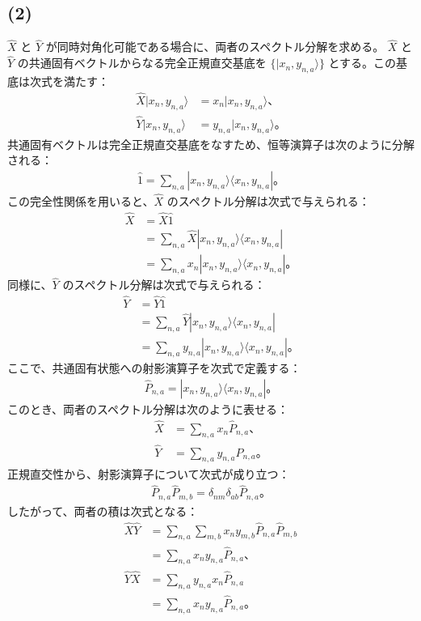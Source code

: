 \documentclass[platex,dvipdfmx,a4paper]{jsarticle}
\begin{document}
\subsection*{(2)}
$\hat{X}$ と $\hat{Y}$ が同時対角化可能である場合に、両者のスペクトル分解を求める。
$\hat{X}$ と $\hat{Y}$ の共通固有ベクトルからなる完全正規直交基底を $\{|x_n,y_{n,a}\rangle\}$ とする。この基底は次式を満たす：
\begin{align*}
  \hat{X}|x_n,y_{n,a}\rangle &= x_n|x_n,y_{n,a}\rangle、\\
  \hat{Y}|x_n,y_{n,a}\rangle &= y_{n,a}|x_n,y_{n,a}\rangle。
\end{align*}
共通固有ベクトルは完全正規直交基底をなすため、恒等演算子は次のように分解される：
\begin{align*}
  \hat{1}=\sum_{n,a}|x_n,y_{n,a}\rangle\langle x_n,y_{n,a}|。
\end{align*}
この完全性関係を用いると、$\hat{X}$ のスペクトル分解は次式で与えられる：
\begin{align*}
  \hat{X}
  &= \hat{X}\hat{1} \\
  &= \sum_{n,a}\hat{X}|x_n,y_{n,a}\rangle\langle x_n,y_{n,a}| \\
  &= \sum_{n,a}x_n|x_n,y_{n,a}\rangle\langle x_n,y_{n,a}|。
\end{align*}
同様に、$\hat{Y}$ のスペクトル分解は次式で与えられる：
\begin{align*}
  \hat{Y}
  &= \hat{Y}\hat{1} \\
  &= \sum_{n,a}\hat{Y}|x_n,y_{n,a}\rangle\langle x_n,y_{n,a}| \\
  &= \sum_{n,a}y_{n,a}|x_n,y_{n,a}\rangle\langle x_n,y_{n,a}|。
\end{align*}
ここで、共通固有状態への射影演算子を次式で定義する：
\begin{align*}
  \hat{P}_{n,a}=|x_n,y_{n,a}\rangle\langle x_n,y_{n,a}|。
\end{align*}
このとき、両者のスペクトル分解は次のように表せる：
\begin{align*}
  \hat{X} &= \sum_{n,a}x_n\hat{P}_{n,a}、\\
  \hat{Y} &= \sum_{n,a}y_{n,a}\hat{P}_{n,a}。
\end{align*}
正規直交性から、射影演算子について次式が成り立つ：
\begin{align*}
  \hat{P}_{n,a}\hat{P}_{m,b}=\delta_{nm}\delta_{ab}\hat{P}_{n,a}。
\end{align*}
したがって、両者の積は次式となる：
\begin{align*}
  \hat{X}\hat{Y}
  &= \sum_{n,a}\sum_{m,b}x_ny_{m,b}\hat{P}_{n,a}\hat{P}_{m,b} \\
  &= \sum_{n,a}x_ny_{n,a}\hat{P}_{n,a}、\\
  \hat{Y}\hat{X}
  &= \sum_{n,a}y_{n,a}x_n\hat{P}_{n,a} \\
  &= \sum_{n,a}x_ny_{n,a}\hat{P}_{n,a}。
\end{align*}
\end{document}

